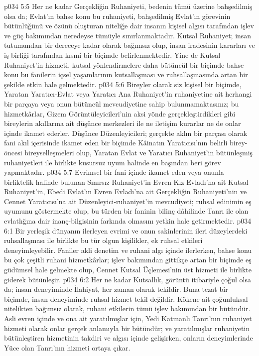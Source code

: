 \vs p034 5:5 Her ne kadar Gerçekliğin Ruhaniyeti, bedenin tümü üzerine bahşedilmiş olsa da; Evlat’ın bahse konu bu ruhaniyeti, bahşedilmiş Evlat’ın görevinin bütünlüğünü ve özünü oluşturan niteliğe dair insanın kişisel algısı tarafından işlev ve güç bakımından neredeyse tümüyle sınırlanmaktadır. Kutsal Ruhaniyet; insan tutumundan bir dereceye kadar olarak bağımsız olup, insan iradesinin kararları ve iş birliği tarafından kısmi bir biçimde belirlenmektedir. Yine de Kutsal Ruhaniyet’in hizmeti, kutsal yönlendirmelere daha bütüncül bir biçimde  bahse konu bu fanilerin içsel yaşamlarının kutsallaşması ve ruhsallaşmasında artan bir şekilde etkin hale gelmektedir.
\vs p034 5:6 Bireyler olarak siz kişisel bir biçimde, Yaratan Yaratıcı\hyp{}Evlat veya Yaratıcı Ana Ruhaniyet’in ruhaniyetine ait herhangi bir parçaya veya onun bütüncül mevcudiyetine sahip bulunmamaktasınız; bu hizmetkârlar, Gizem Görüntüleyicileri’nin aksi yönde gerçekleştirdikleri gibi bireylerin akıllarına ait düşünce merkezleri ile ne iletişim kurarlar ne de onlar içinde ikamet ederler. Düşünce Düzenleyicileri; gerçekte aklın bir parçası olarak fani akıl içerisinde ikamet eden bir biçimde Kâinatın Yaratıcısı’nın belirli birey\hyp{}öncesi bireyselleşmeleri olup, Yaratan Evlat ve Yaratıcı Ruhaniyet’in bütünleşmiş ruhaniyetleri ile birlikte kusursuz uyum halinde en başından beri görev yapmaktadır.
\vs p034 5:7 Evrimsel bir fani içinde ikamet eden veya onunla birliktelik halinde bulunan Sınırsız Ruhaniyet’in Evren Kız Evladı’na ait Kutsal Ruhaniyet’in, Ebedi Evlat’ın Evren Evladı’na ait Gerçekliğin Ruhaniyeti’nin ve Cennet Yaratıcısı’na ait Düzenleyici\hyp{}ruhaniyet’in mevcudiyeti; ruhsal edinimin eş uyumunu göstermekte olup, bu türden bir faninin bilinç dâhilinde Tanrı ile olan evlatlığına dair inanç\hyp{}bilgisinin farkında olmasını yetkin hale getirmektedir.
\vs p034 6:1 Bir yerleşik dünyanın ilerleyen evrimi ve onun sakinlerinin ileri düzeylerdeki ruhsallaşması ile birlikte bu tür olgun kişilikler, ek ruhsal etkileri deneyimleyebilir. Faniler akli denetim ve ruhani algı içinde ilerlerken, bahse konu bu çok çeşitli ruhani hizmetkârlar; işlev bakımından gittikçe artan bir biçimde eş güdümsel hale gelmekte olup, Cennet Kutsal Üçlemesi’nin üst hizmeti ile birlikte giderek bütünleşir.
\vs p034 6:2 Her ne kadar Kutsallık, görüntü itibariyle çoğul olsa da; insan deneyiminde İlahiyat, her zaman  olarak tekildir. Buna tezat bir biçimde, insan deneyiminde ruhsal hizmet tekil değildir. Kökene ait çoğunluksal nitelikten bağımsız olarak, ruhani etkilerin tümü işlev bakımından bir bütündür. Asli evren içinde ve ona ait yaratılmışlar için, Yedi Katmanlı Tanrı’nın ruhaniyet hizmeti olarak onlar gerçek anlamıyla bir bütündür; ve yaratılmışlar ruhaniyetin bütünleştiren hizmetinin takdiri ve algısı içinde gelişirken, onların deneyimlerinde Yüce olan Tanrı’nın hizmeti ortaya çıkar.
